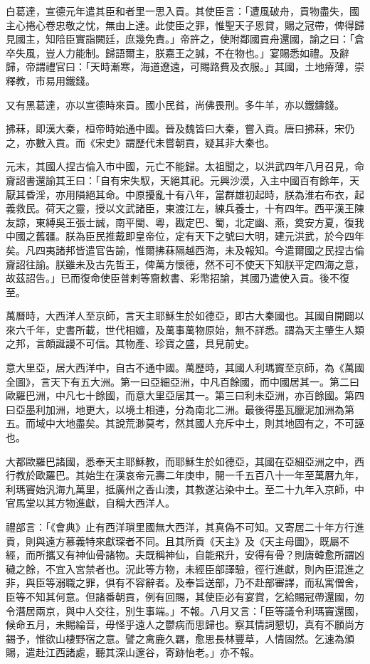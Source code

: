 \begin{pinyinscope}
白葛達，宣德元年遣其臣和者里一思入貢。其使臣言：「遭風破舟，貢物盡失，國主心捲心卷忠敬之忱，無由上達。此使臣之罪，惟聖天子恩貸，賜之冠帶，俾得歸見國主，知陪臣實詣闕廷，庶幾免責。」帝許之，使附鄰國貢舟還國，諭之曰：「倉卒失風，豈人力能制。歸語爾主，朕嘉王之誠，不在物也。」宴賜悉如禮。及辭歸，帝謂禮官曰：「天時漸寒，海道遼遠，可賜路費及衣服。」其國，土地瘠薄，崇釋教，市易用鐵錢。

又有黑葛達，亦以宣德時來貢。國小民貧，尚佛畏刑。多牛羊，亦以鐵鑄錢。

拂菻，即漢大秦，桓帝時始通中國。晉及魏皆曰大秦，嘗入貢。唐曰拂菻，宋仍之，亦數入貢。而《宋史》謂歷代未嘗朝貢，疑其非大秦也。

元末，其國人捏古倫入市中國，元亡不能歸。太祖聞之，以洪武四年八月召見，命齎詔書還諭其王曰：「自有宋失馭，天絕其祀。元興沙漠，入主中國百有餘年，天厭其昏淫，亦用隕絕其命。中原擾亂十有八年，當群雄初起時，朕為淮右布衣，起義救民。荷天之靈，授以文武諸臣，東渡江左，練兵養士，十有四年。西平漢王陳友諒，東縛吳王張士誠，南平閩、粵，戡定巴、蜀，北定幽、燕，奠安方夏，復我中國之舊疆。朕為臣民推戴即皇帝位，定有天下之號曰大明，建元洪武，於今四年矣。凡四夷諸邦皆遣官告諭，惟爾拂菻隔越西海，未及報知。今遣爾國之民捏古倫齎詔往諭。朕雖未及古先哲王，俾萬方懷德，然不可不使天下知朕平定四海之意，故茲詔告。」已而復命使臣普剌等齎敕書、彩幣招諭，其國乃遣使入貢。後不復至。

萬曆時，大西洋人至京師，言天主耶穌生於如德亞，即古大秦國也。其國自開闢以來六千年，史書所載，世代相嬗，及萬事萬物原始，無不詳悉。謂為天主肇生人類之邦，言頗誕謾不可信。其物產、珍寶之盛，具見前史。

意大里亞，居大西洋中，自古不通中國。萬歷時，其國人利瑪竇至京師，為《萬國全圖》，言天下有五大洲。第一曰亞細亞洲，中凡百餘國，而中國居其一。第二曰歐羅巴洲，中凡七十餘國，而意大里亞居其一。第三曰利未亞洲，亦百餘國。第四曰亞墨利加洲，地更大，以境土相連，分為南北二洲。最後得墨瓦臘泥加洲為第五。而域中大地盡矣。其說荒渺莫考，然其國人充斥中土，則其地固有之，不可誣也。

大都歐羅巴諸國，悉奉天主耶穌教，而耶穌生於如德亞，其國在亞細亞洲之中，西行教於歐羅巴。其始生在漢哀帝元壽二年庚申，閱一千五百八十一年至萬曆九年，利瑪竇始汎海九萬里，抵廣州之香山澳，其教遂沾染中土。至二十九年入京師，中官馬堂以其方物進獻，自稱大西洋人。

禮部言：「《會典》止有西洋瑣里國無大西洋，其真偽不可知。又寄居二十年方行進貢，則與遠方慕義特來獻琛者不同。且其所貢《天主》及《天主母圖》，既屬不經，而所攜又有神仙骨諸物。夫既稱神仙，自能飛升，安得有骨？則唐韓愈所謂凶穢之餘，不宜入宮禁者也。況此等方物，未經臣部譯驗，徑行進獻，則內臣混進之非，與臣等溺職之罪，俱有不容辭者。及奉旨送部，乃不赴部審譯，而私寓僧舍，臣等不知其何意。但諸番朝貢，例有回賜，其使臣必有宴賞，乞給賜冠帶還國，勿令潛居兩京，與中人交往，別生事端。」不報。八月又言：「臣等議令利瑪竇還國，候命五月，未賜綸音，毋怪乎遠人之鬱病而思歸也。察其情詞懇切，真有不願尚方錫予，惟欲山棲野宿之意。譬之禽鹿久羈，愈思長林豐草，人情固然。乞速為頒賜，遣赴江西諸處，聽其深山邃谷，寄跡怡老。」亦不報。


\end{pinyinscope}
